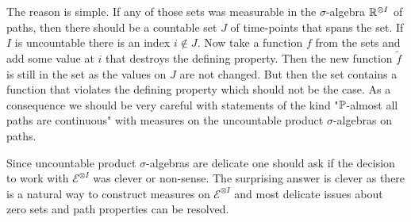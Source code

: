 The reason is simple. If any of those sets was measurable in the $\sigma$-algebra $\R^{\otimes I}$ of paths, then there should be a countable set $J$ of time-points that spans the set. If $I$ is uncountable there is an index $i\notin J$. Now take a function $f$ from the sets and add some value at $i$ that destroys the defining property. Then the new function $\tilde f$ is still in the set as the values on $J$ are not changed. But then the set contains a function that violates the defining property which should not be the case. As a consequence we should be very careful with statements of the kind "{}$\P$-almost all paths are continuous"{} with measures on the uncountable product $\sigma$-algebras on paths.\smallskip

Since uncountable product $\sigma$-algebras are delicate one should ask if the decision to work with $\mathcal E^{\otimes I}$ was clever or non-sense. The surprising answer is clever as there is a natural way to construct measures on $\mathcal E^{\otimes I}$ and most delicate issues about zero sets and path properties can be resolved.

